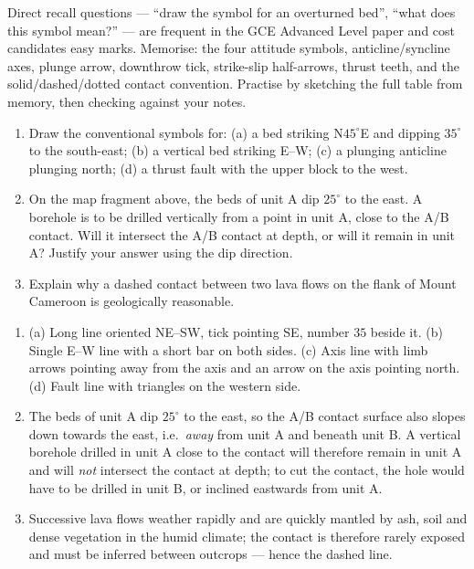 \documentclass[11pt]{article}
\begin{document}
\begin{aretenir}
Direct recall questions --- ``draw the symbol for an overturned bed'', ``what does this symbol mean?'' --- are frequent in the GCE Advanced Level paper and cost candidates easy marks. Memorise: the four attitude symbols, anticline/syncline axes, plunge arrow, downthrow tick, strike-slip half-arrows, thrust teeth, and the solid/dashed/dotted contact convention. Practise by sketching the full table from memory, then checking against your notes.
\end{aretenir}

\begin{exercice}
\begin{enumerate}
\item Draw the conventional symbols for: (a) a bed striking N$45^{\circ}$E and dipping $35^{\circ}$ to the south-east; (b) a vertical bed striking E--W; (c) a plunging anticline plunging north; (d) a thrust fault with the upper block to the west.
\item On the map fragment above, the beds of unit A dip $25^{\circ}$ to the east. A borehole is to be drilled vertically from a point in unit A, close to the A/B contact. Will it intersect the A/B contact at depth, or will it remain in unit A? Justify your answer using the dip direction.
\item Explain why a dashed contact between two lava flows on the flank of Mount Cameroon is geologically reasonable.
\end{enumerate}
\end{exercice}

\begin{corrige}[Exercise 1]
\begin{enumerate}
\item (a) Long line oriented NE--SW, tick pointing SE, number $35$ beside it. (b) Single E--W line with a short bar on both sides. (c) Axis line with limb arrows pointing away from the axis and an arrow on the axis pointing north. (d) Fault line with triangles on the western side.
\item The beds of unit A dip $25^{\circ}$ to the east, so the A/B contact surface also slopes down towards the east, i.e.\ \emph{away} from unit A and beneath unit B. A vertical borehole drilled in unit A close to the contact will therefore remain in unit A and will \emph{not} intersect the contact at depth; to cut the contact, the hole would have to be drilled in unit B, or inclined eastwards from unit A.
\item Successive lava flows weather rapidly and are quickly mantled by ash, soil and dense vegetation in the humid climate; the contact is therefore rarely exposed and must be inferred between outcrops --- hence the dashed line.
\end{enumerate}
\end{corrige}
\end{document}
